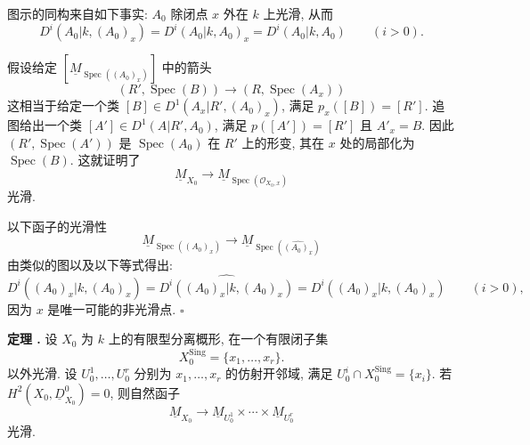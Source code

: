 
\begin{center}
\scriptsize
{}
\end{center}
图示的同构来自如下事实: $A_0$ 除闭点 $x$ 外在 $k$ 上光滑, 从而
\[
D^i(A_0|k,(A_0)_x)
=D^i(A_0|k,A_0)_x
=D^i(A_0|k,A_0)
\qquad(i>0).
\]

假设给定 $[\underline M_{\operatorname{Spec}((A_0)_x)}]$ 中的箭头
\[
(R',\operatorname{Spec}(B))
\longrightarrow(R,\operatorname{Spec}(A_x))
\]
这相当于给定一个类 $[B]\in D^1(A_x|R',(A_0)_x)$, 满足 $p_x([B])=[R']$. 追图给出一个类 $[A']\in D^1(A|R',A_0)$, 满足 $p([A'])=[R']$ 且 $A'_x=B$. 因此 $(R',\operatorname{Spec}(A'))$ 是 $\operatorname{Spec}(A_0)$ 在 $R'$ 上的形变, 其在 $x$ 处的局部化为 $\operatorname{Spec}(B)$. 这就证明了
\[
\underline M_{X_0}\longrightarrow
\underline M_{\operatorname{Spec}(\mathcal O_{X_0,x})}
\]
光滑.

以下函子的光滑性
\[
\underline M_{\operatorname{Spec}((A_0)_x)}
\longrightarrow
\underline M_{\operatorname{Spec}(\widehat{(A_0)_x})}
\]
由类似的图以及以下等式得出:
\[
D^i((A_0)_x|k,\widehat{(A_0)_x})
=\widehat{D^i((A_0)_x|k,(A_0)_x)}
=D^i((A_0)_x|k,(A_0)_x)
\qquad(i>0),
\]
因为 $x$ 是唯一可能的非光滑点. \hfill$\square$



\medskip
\noindent\textbf{定理 .}
设 $X_0$ 为 $k$ 上的有限型分离概形, 在一个有限闭子集
\[
X_0^{\mathrm{Sing}}=\{x_1,\ldots,x_r\}.
\]
以外光滑. 设 $U_0^1,\ldots,U_0^r$ 分别为 $x_1,\ldots,x_r$ 的仿射开邻域, 满足 $U_0^i\cap X_0^{\mathrm{Sing}}=\{x_i\}$. 若 $H^2(X_0,\underline D^0_{X_0})=0$, 则自然函子
\[
\underline M_{X_0}\longrightarrow
\underline M_{U_0^1}\times\cdots\times\underline M_{U_0^r}
\]
光滑.

